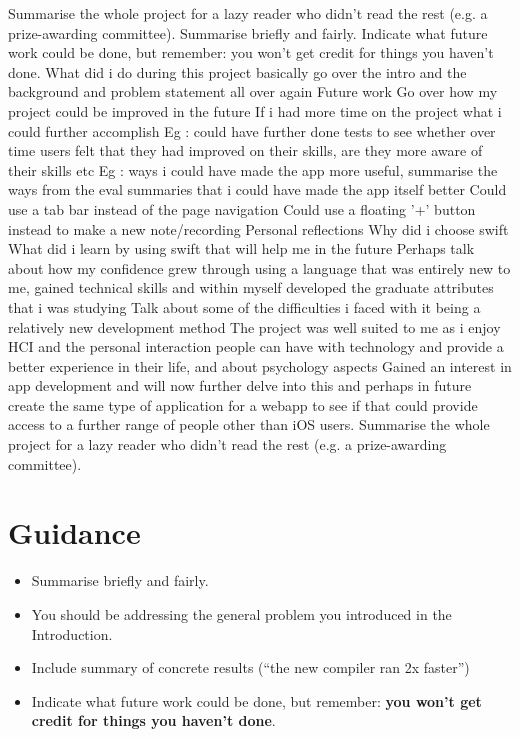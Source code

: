 \documentclass{l4proj}
\begin{document}
Summarise the whole project for a lazy reader who didn't read the rest (e.g. a prize-awarding committee).
Summarise briefly and fairly. Indicate what future work could be done, but remember: you won't get credit for things you haven't done.
What did i do during this project
basically go over the intro and the background and problem statement all over again
Future work
Go over how my project could be improved in the future
If i had more time on the project what i could further accomplish
Eg : could have further done tests to see whether over time users felt that they had improved on their skills, are they more aware of their skills etc
Eg : ways i could have made the app more useful, summarise the ways from the eval summaries that i could have made the app itself better
Could use a tab bar instead of the page navigation
Could use a floating '+' button instead to make a new note/recording
Personal reflections
Why did i choose swift
What did i learn by using swift that will help me in the future
Perhaps talk about how my confidence grew through using a language that was entirely new to me, gained technical skills and within myself developed the graduate attributes that i was studying
Talk about some of the difficulties i faced with it being a relatively new development method
The project was well suited to me as i enjoy HCI and the personal interaction people can have with technology and provide a better experience in their life, and about psychology aspects
Gained an interest in app development and will now further delve into this and perhaps in future create the same type of application for a webapp to see if that could provide access to a further range of people other than iOS users.  
Summarise the whole project for a lazy reader who didn't read the rest (e.g. a prize-awarding committee).


\section{Guidance}
\begin{itemize}
    \item
        Summarise briefly and fairly.
    \item
        You should be addressing the general problem you introduced in the
        Introduction.        
    \item
        Include summary of concrete results (``the new compiler ran 2x
        faster'')
    \item
        Indicate what future work could be done, but remember: \textbf{you
        won't get credit for things you haven't done}.
\end{itemize}
\end{document}
